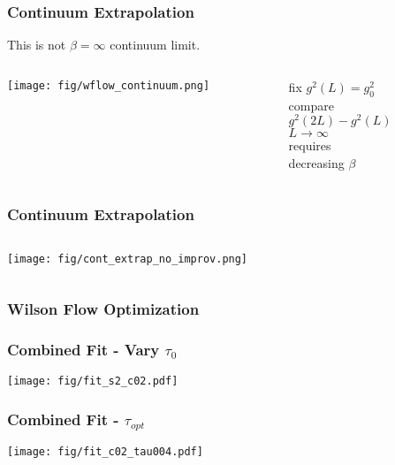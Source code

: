 \documentclass{beamer}
\begin{document}
  \begin{frame}
    \frametitle{Continuum Extrapolation}
    This is not $\beta = \infty$ continuum limit.
    \begin{columns}
      \begin{column}{0.7\textwidth}
        \texttt{[image: fig/wflow\_continuum.png]}
      \end{column}
      \begin{column}{0.3\textwidth}
        \begin{center}
          fix $g^2(L)=g_0^2$\\\vspace{24pt}
          compare\\$g^2(2L)-g^2(L)$\\\vspace{24pt}
          $L\rightarrow \infty$\\requires\\decreasing $\beta$
        \end{center}
      \end{column}
    \end{columns}
  \end{frame}

  \begin{frame}
    \frametitle{Continuum Extrapolation}
    \begin{columns}
      \begin{column}{0.7\textwidth}
        \texttt{[image: fig/cont\_extrap\_no\_improv.png]}
      \end{column}
      \begin{column}{0.3\textwidth}
        \begin{center}
        \end{center}
      \end{column}
    \end{columns}
  \end{frame}

  \begin{frame}
    \frametitle{Wilson Flow Optimization}
  \end{frame}

  \begin{frame}
    \frametitle{Combined Fit - Vary $\tau_0$}
      \texttt{[image: fig/fit\_s2\_c02.pdf]}
  \end{frame}

  \begin{frame}
    \frametitle{Combined Fit - $\tau_{opt}$}
    \texttt{[image: fig/fit\_c02\_tau004.pdf]}
  \end{frame}
\end{document}
